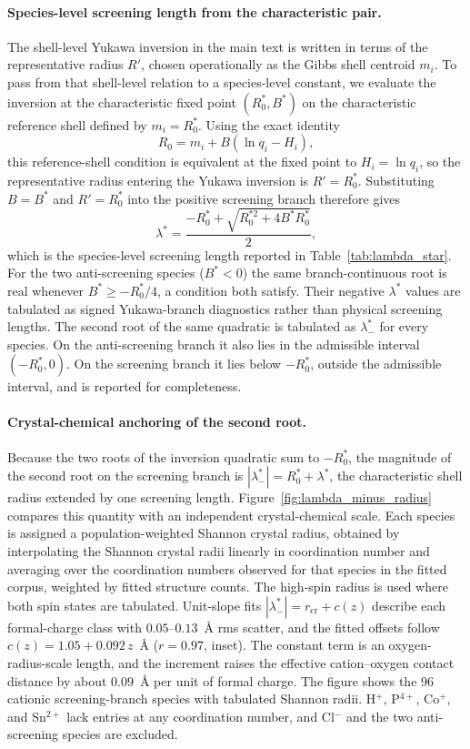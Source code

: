 \documentclass[aps,prmaterials,twocolumn,10pt,superscriptaddress,floatfix]{revtex4-2}
\begin{document}
\paragraph*{Species-level screening length from the characteristic pair.}
The shell-level Yukawa inversion in the main text is written in terms of the
representative radius $R'$, chosen operationally as the Gibbs shell
centroid $m_i$.  To pass from that shell-level relation to a species-level
constant, we evaluate the inversion at the characteristic fixed point
$(R_0^*,B^*)$ on the characteristic reference shell defined by $m_i=R_0^*$.
Using the exact identity
\[
R_0 = m_i + B(\ln q_i - H_i),
\]
this reference-shell condition is equivalent at the fixed point to
$H_i=\ln q_i$, so the representative radius entering the Yukawa inversion is
$R'=R_0^*$.  Substituting $B=B^*$ and $R'=R_0^*$ into the positive screening
branch therefore gives
\[
\lambda^*=\frac{-R_0^*+\sqrt{R_0^{*2}+4B^*R_0^*}}{2},
\]
which is the species-level screening length reported in
Table~\ref{tab:lambda_star}.  For the two anti-screening species
($B^*<0$) the same branch-continuous root is real whenever
$B^*\ge -R_0^*/4$, a condition both satisfy.  Their negative
$\lambda^*$ values are tabulated as signed Yukawa-branch diagnostics
rather than physical screening lengths.  The second root of the same
quadratic is tabulated as $\lambda^*_-$ for every species.  On the
anti-screening branch it also lies in the admissible interval
$(-R_0^*,0)$.  On the screening branch it lies below $-R_0^*$,
outside the admissible interval, and is reported for completeness.

\paragraph*{Crystal-chemical anchoring of the second root.}
Because the two roots of the inversion quadratic sum to $-R_0^*$, the
magnitude of the second root on the screening branch is
$|\lambda^*_-|=R_0^*+\lambda^*$, the characteristic shell radius
extended by one screening length.
Figure~\ref{fig:lambda_minus_radius} compares this quantity with an
independent crystal-chemical scale.  Each species is assigned a
population-weighted Shannon crystal radius, obtained by interpolating
the Shannon crystal radii \cite{Shannon1976} linearly in coordination
number and averaging over the coordination numbers observed for that
species in the fitted corpus, weighted by fitted structure counts.
The high-spin radius is used where both spin states are tabulated.
Unit-slope fits $|\lambda^*_-|=r_{\mathrm{cr}}+c(z)$ describe each
formal-charge class with $0.05$--$0.13$~\AA{} rms scatter, and the
fitted offsets follow $c(z)=1.05+0.092\,z$~\AA{} ($r=0.97$, inset).
The constant term is an oxygen-radius-scale length, and the increment
raises the effective cation--oxygen contact distance by about
$0.09$~\AA{} per unit of formal charge.  The figure shows the 96
cationic screening-branch species with tabulated Shannon radii.
H$^{+}$, P$^{4+}$, Co$^{+}$, and Sn$^{2+}$ lack entries at any
coordination number, and Cl$^{-}$ and the two anti-screening species
are excluded.
\end{document}
